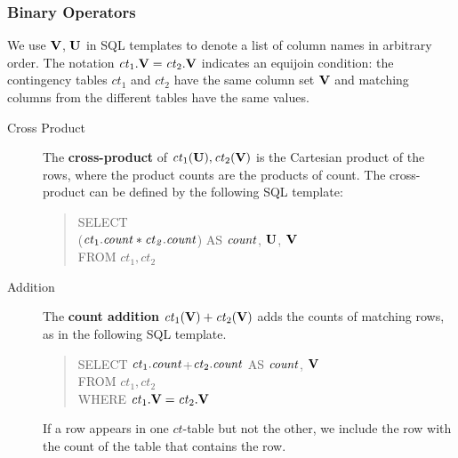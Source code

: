 \documentclass{acm_proc_article-sp}
\newcommand{\ct}{\mathit{ct}}
\begin{document}
\subsubsection{Binary Operators} \label{sec:bin}
We use $\mathbf{V}$, $\mathbf{U}$ in SQL templates to denote a list of column names in arbitrary order. The notation $\ct_{1}.\set{V} = \ct_{2}.\set{V}$ indicates an equijoin condition: the contingency tables $\ct_{1}$ and $\ct_{2}$ have the same column set $\mathbf{V}$ and matching columns from the different tables have the same values.
\begin{description}
\item[Cross Product]  %
The \textbf{cross-product} of $\ct_{1}(\set{U}),\ct_{2}(\set{V})$ is the Cartesian product of the rows, where the product counts are the products of count. The cross-product can be defined by the following SQL template:
\begin{quote}
SELECT \\($\ct_{1}.\qcount *\ct_{2}.\qcount$) AS $\it{count}$,  $\mathbf{U}$, $\mathbf{V}$\\
FROM  $\ct_{1},\ct_{2}$
\end{quote}


\item[Addition] 
 The \textbf{count addition} $\ct_{1}(\set{V}) + \ct_{2}(\set{V})$ adds the counts of matching rows, as in the following SQL template.
\begin{quote}
SELECT %
$\ct_{1}.\qcount$+$\ct_{2}.\qcount$ AS $\it{count}$, $\mathbf{V}$ \\%
FROM  $\ct_{1},\ct_{2}$\\
WHERE $\ct_{1}.\set{V} = \ct_{2}.\set{V}$
\end{quote}

If a row appears in one $\ct$-table but not the other, we include the row with the count of the table that contains the row. %


\end{description}
\end{document}
